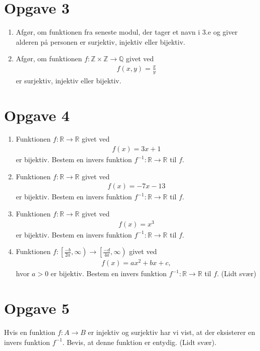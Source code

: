 \begin{center}
\end{center}

\section*{Opgave 3}
\begin{enumerate}[label=\roman*)]
\item Afgør, om funktionen fra seneste modul, der tager et navn i 3.e og giver alderen på personen er surjektiv, injektiv eller bijektiv.
\item Afgør, om funktionen $f:\mathbb{Z}\times \mathbb{Z} \to \mathbb{Q}$ givet ved
\begin{align*}
	f(x,y) = \frac{x}{y}
\end{align*}
er surjektiv, injektiv eller bijektiv. 
\end{enumerate}
\section*{Opgave 4}
\begin{enumerate}[label=\roman*)]
	\item Funktionen $f:\mathbb{R} \to \mathbb{R}$ givet ved 
	\begin{align*}
		f(x) = 3x+1
	\end{align*}
	er bijektiv. Bestem en invers funktion $f^{-1}:\mathbb{R} \to \mathbb{R}$ til $f$. 
	\item Funktionen $f:\mathbb{R} \to \mathbb{R}$ givet ved 
	\begin{align*}
		f(x) = -7x-13
	\end{align*}
	er bijektiv. Bestem en invers funktion $f^{-1}:\mathbb{R} \to \mathbb{R}$ til $f$. 
	\item Funktionen $f:\mathbb{R} \to \mathbb{R}$ givet ved 
	\begin{align*}
		f(x) = x^3
	\end{align*}
	er bijektiv. Bestem en invers funktion $f^{-1}:\mathbb{R} \to \mathbb{R}$ til $f$. 
	\item Funktionen $f:\left[\frac{-b}{2a},\infty\right) \to \left[\frac{-d}{4a},\infty\right)$ givet ved 
	\begin{align*}
		f(x) = ax^2+bx+c,
	\end{align*} hvor $a>0$
	er bijektiv. Bestem en invers funktion $f^{-1}:\mathbb{R} \to \mathbb{R}$ til $f$. (Lidt svær) 
\end{enumerate}
\section*{Opgave 5}
Hvis en funktion $f:A \to B$ er injektiv og surjektiv har vi vist, at der eksisterer en invers funktion $f^{-1}$. Bevis, at denne funktion er entydig. (Lidt svær).
